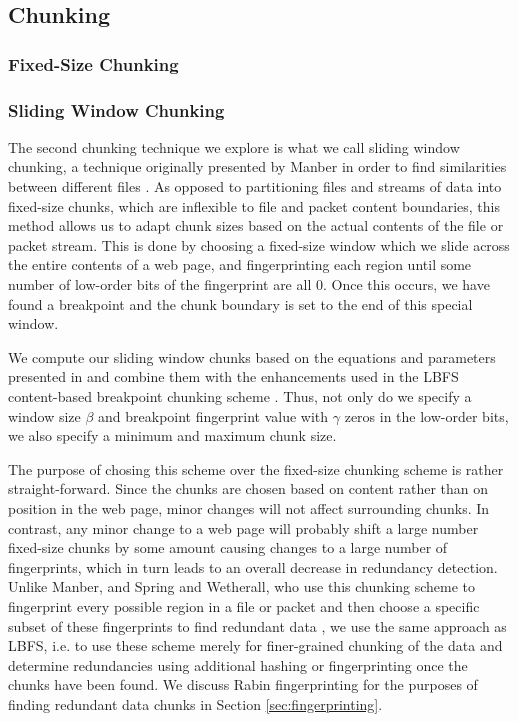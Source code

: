 \subsection{Chunking}
\label{sec:chunking}
\subsubsection{Fixed-Size Chunking}

\subsubsection{Sliding Window Chunking}
The second chunking technique we explore is what we call sliding window chunking, a technique originally presented by Manber in order to find similarities between different files \cite{Manber}. As opposed to partitioning files and streams of data into fixed-size chunks, which are inflexible to file and packet content boundaries, this method allows us to adapt chunk sizes based on the actual contents of the file or packet stream. This is done by choosing a fixed-size window which we slide across the entire contents of a web page, and fingerprinting each region until some number of low-order bits of the fingerprint are all 0. Once this occurs, we have found a breakpoint and the chunk boundary is set to the end of this special window. 

We compute our sliding window chunks based on the equations and parameters presented in \cite{spring} and combine them with the enhancements used in the LBFS content-based breakpoint chunking scheme \cite{lbfs}. Thus, not only do we specify a window size $\beta$ and breakpoint fingerprint value with $\gamma$ zeros in the low-order bits, we also specify a minimum and maximum chunk size. 

The purpose of chosing this scheme over the fixed-size chunking scheme is rather straight-forward. Since the chunks are chosen based on content rather than on position in the web page, minor changes will not affect surrounding chunks. In contrast, any minor change to a web page will probably shift a large number fixed-size chunks by some amount causing changes to a large number of fingerprints, which in turn leads to an overall decrease in redundancy detection. Unlike Manber, and Spring and Wetherall, who use this chunking scheme to fingerprint every possible region in a file or packet and then choose a specific subset of these fingerprints to find redundant data \cite{manber,spring}, we use the same approach as LBFS, i.e. to use these scheme merely for finer-grained chunking of the data and determine redundancies using additional hashing or fingerprinting once the chunks have been found. We discuss Rabin fingerprinting for the purposes of finding redundant data chunks in Section \ref{sec:fingerprinting}. 


